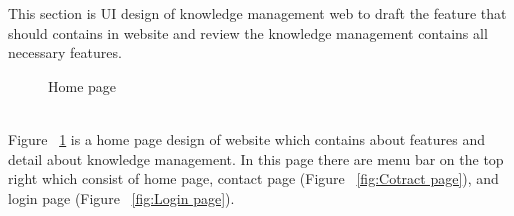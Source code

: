 \documentclass[12pt,oneside,openright,a4paper]{cpe-english-project}
\begin{document}
 This section is UI design of knowledge management web to draft the feature that should 
contains in website and review the knowledge management contains all necessary features. \\ \bigskip
\begin{figure}[!h]\centering
{}
\caption{Home page}\label{fig:Home page}
\end{figure}\\
Figure ~\ref*{fig:Home page} is a home page design of website which contains about features and detail 
about knowledge management. In this page there are menu bar on the top right which consist 
of home page, contact page (Figure ~\ref*{fig:Cotract page}), and login page (Figure ~\ref*{fig:Login page}). 
\end{document}
